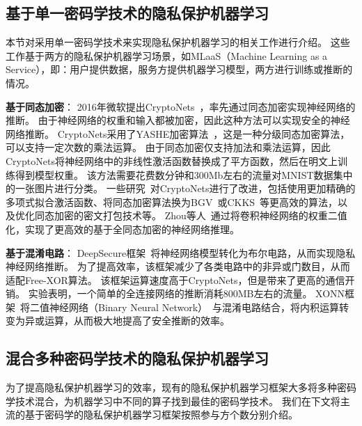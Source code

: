 \subsection{基于单一密码学技术的隐私保护机器学习}
本节对采用单一密码学技术来实现隐私保护机器学习的相关工作进行介绍。
%
这些工作基于两方的隐私保护机器学习场景，如MLaaS（Machine Learning as a Service），即：用户提供数据，服务方提供机器学习模型，两方进行训练或推断的情况。
%

\textbf{基于同态加密}：
2016年微软提出CryptoNets~\cite{gilad2016cryptonets}，率先通过同态加密实现神经网络的推断。
%
由于神经网络的权重和输入都被加密，因此这种方法可以实现安全的神经网络推断。
%
CryptoNets采用了YASHE加密算法~\cite{bos2013yashe}，这是一种分级同态加密算法，可以支持一定次数的乘法运算。
%
由于同态加密仅支持加法和乘法运算，因此CryptoNets将神经网络中的非线性激活函数替换成了平方函数，然后在明文上训练得到模型权重。
%
该方法需要花费数分钟和300Mb左右的流量对MNIST数据集中的一张图片进行分类。
%
%
一些研究~\cite{hesamifard2017cryptodl,chabanne2017pp_dnn}对CryptoNets进行了改进，包括使用更加精确的多项式拟合激活函数、将同态加密算法换为BGV~\cite{2014bgv}或CKKS~\cite{ckks2017}等更高效的算法，以及优化同态加密的密文打包技术等。
%
Zhou等人~\cite{zhoujunwei2020binary_encrypted_nn}通过将卷积神经网络的权重二值化，实现了更高效的基于全同态加密的神经网络推理。

\textbf{基于混淆电路}：
DeepSecure框架~\cite{rouhani2018deepsecure}将神经网络模型转化为布尔电路，从而实现隐私神经网络推断。
%
为了提高效率，该框架减少了各类电路中的非异或门数目，从而适配Free-XOR算法。
%
该框架运算速度高于CryptoNets，但是带来了更高的通信开销。
%
实验表明，一个简单的全连接网络的推断消耗800MB左右的流量。
%
XONN框架~\cite{riazi2019xonn}将二值神经网络（Binary Neural Network）~\cite{qinhaotong_2020_binary_nn}与混淆电路结合，将内积运算转变为异或运算，从而极大地提高了安全推断的效率。


\subsection{混合多种密码学技术的隐私保护机器学习}
为了提高隐私保护机器学习的效率，现有的隐私保护机器学习框架大多将多种密码学技术混合，为机器学习中不同的算子找到最佳的密码学技术。
%
我们在下文将主流的基于密码学的隐私保护机器学习框架按照参与方个数分别介绍。

